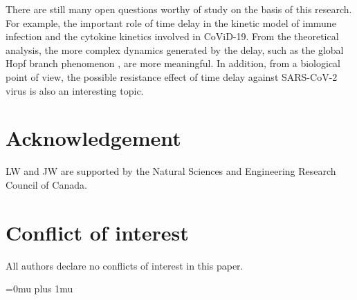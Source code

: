 \documentclass{CMHPhD-SIVD}
\begin{document}
There are still many open questions worthy of study on the basis of this research. For example, the important role of time delay in the kinetic model of immune infection and the cytokine kinetics involved in CoViD-19. From the theoretical analysis, the more complex dynamics generated by the delay, such as the global Hopf branch phenomenon \cite{shu2020complex,jiang2016global}, are more meaningful. In addition, from a biological point of view, the possible resistance effect of time delay against SARS-CoV-2 virus is also an interesting topic.

\section*{Acknowledgement}
LW and JW are supported by the Natural Sciences and Engineering Research Council of Canada.
\section*{Conflict of interest}
All authors declare no conflicts of interest in this paper.

%
\begingroup
\Urlmuskip=0mu plus 1mu\relax
\def\UrlBreaks{\do\/\do-/\do.}
\printbibliography
\endgroup
\end{document}
